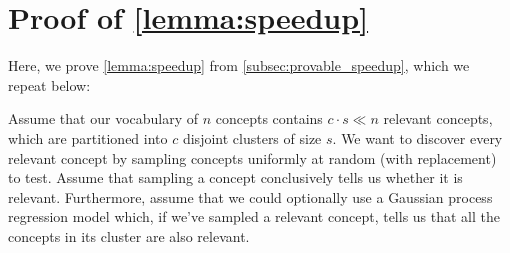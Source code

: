 

\section{Proof of \cref{lemma:speedup}}
\label{sec:proof}

Here, we prove \cref{lemma:speedup} from \cref{subsec:provable_speedup}, which we repeat below:

Assume that our vocabulary of $n$ concepts contains $c \cdot s \ll n $ relevant concepts, which are partitioned into $c$ disjoint clusters of size $s$. We want to discover every relevant concept by sampling concepts uniformly at random (with replacement) to test. Assume that sampling a concept conclusively tells us whether it is relevant. Furthermore, assume that we could optionally use a Gaussian process regression model which, if we've sampled a relevant concept, tells us that all the concepts in its cluster are also relevant.
\vspace{0.5em}

\lemmaspeedup*

